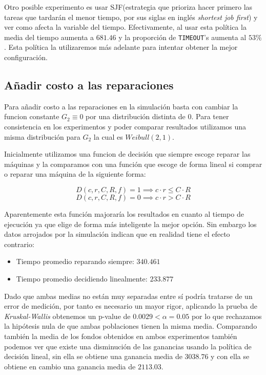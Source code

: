 \documentclass[10pt,twocolumn]{article}
\begin{document}
Otro posible experimento es usar SJF(estrategia que prioriza hacer primero las tareas que tardarán el menor tiempo, por sus siglas en inglés \textit{shortest job first}) y ver como afecta la variable del tiempo. Efectivamente, al usar esta política la media del tiempo aumenta a $681.46$ y la proporción de \texttt{TIMEOUT}'s aumenta al $53\%$. Esta política la utilizaremos más adelante para intentar obtener la mejor configuración.

\subsection{Añadir costo a las reparaciones}

Para añadir costo a las reparaciones en la simulación basta con cambiar la funcion constante $G_{2} \equiv 0$ por una distribución distinta de $0$. Para tener consistencia en los experimentos y poder comparar resultados utilizamos una misma distribución para $G_{2}$ la cual es $Weibull(2, 1)$.

Inicialmente utilizamos una funcion de decisión que siempre escoge reparar las máquinas y la comparamos con una función que escoge de forma lineal si comprar o reparar una máquina de la siguiente forma:

$$
    D(c, r, C, R, f) = 1 \implies c \cdot r \leq C \cdot R
$$
$$
    D(c, r, C, R, f) = 0 \implies c \cdot r > C \cdot R
$$

Aparentemente esta función majoraría los resultados en cuanto al tiempo de ejecución ya que elige de forma más inteligente la mejor opción. Sin embargo los datos arrojados por la simulación indican que en realidad tiene el efecto contrario:

\begin{itemize}
    \item Tiempo promedio reparando siempre: $340.461$
    \item Tiempo promedio decidiendo linealmente: $233.877$
\end{itemize}

Dado que ambas medias no están muy separadas entre sí podría tratarse de un error de medición, por tanto es necesario un mayor rigor, aplicando la prueba de \textit{Kruskal-Wallis} obtenemos un p-value de $0.0029 < \alpha = 0.05$ por lo que rechazamos la hipótesis nula de que ambas poblaciones tienen la misma media. Comparando también la media de los fondos obtenidos en ambos experimentos también podemos ver que existe una disminución de las ganancias usando la política de decisión lineal, sin ella se obtiene una ganancia media de $3038.76$ y con ella se obtiene en cambio una ganancia media de $2113.03$.
\end{document}

